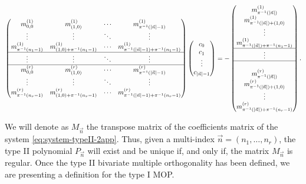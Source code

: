 \documentclass[12pt,a4]{report}
\theoremstyle{plain}
\begin{document}
\begin{equation}
    \label{eq:system-typeII-2app}
    \begin{pmatrix}
        m_{0,0}^{(1)} & m_{(1,0)}^{(1)} & \cdots &  m_{\pi^{-1}(|\vec n|-1)}^{(1)} \\
        \vdots & \vdots & \ddots & \vdots  \\
        m_{\pi^{-1}(n_1-1)}^{(1)} & m_{(1,0)+\pi^{-1}(n_1-1)}^{(1)} & \cdots &  m_{\pi^{-1}(|\vec n|-1)+\pi^{-1}(n_1-1)}^{(1)} \\ \hline
        \vdots & \vdots & \ddots  & \vdots \\ \hline
        m_{0,0}^{(r)} & m_{(1,0)}^{(r)} & \cdots  & m_{\pi^{-1}(|\vec n|-1)}^{(r)} \\
        \vdots & \vdots & \ddots & \vdots \\
        m_{\pi^{-1}(n_r-1)}^{(r)} & m_{(1,0)+\pi^{-1}(n_r-1)}^{(r)} & \cdots  & m_{\pi^{-1}(|\vec n|-1)+\pi^{-1}(n_r-1)}^{(r)}
    \end{pmatrix}\begin{pmatrix}
        c_0 \\ c_1 \\ \vdots \\ c_{|\vec n|-1}
    \end{pmatrix} = - \begin{pmatrix}
        m_{\pi^{-1}(|\vec n|)}^{(1)} \\ m_{\pi^{-1}(|\vec n|)+(1,0)}^{(1)} \\ \vdots \\ m_{\pi^{-1}(|\vec n|)+\pi^{-1}(n_1-1)}^{(1)} \\ \hline \vdots \\ \hline \\ m_{\pi^{-1}(|\vec n|)}^{(r)} \\ m_{\pi^{-1}(|\vec n|)+(1,0)}^{(r)} \\ \vdots \\ m_{\pi^{-1}(|\vec n|)+\pi^{-1}(n_r-1)}^{(r)} 
    \end{pmatrix}.
\end{equation}

We will denote as $M_{\vec n}$ the transpose matrix of the coefficients matrix of the system \eqref{eq:system-typeII-2app}. Thus, given a multi-index $\vec n =(n_1,\dots,n_r)$, the type II polynomial $P_{\vec n}$ will exist and be unique if, and only if, the matrix $M_{\vec n}$ is regular. Once the type II bivariate multiple orthogonality has been defined, we are presenting a definition for the type I MOP.
\end{document}
